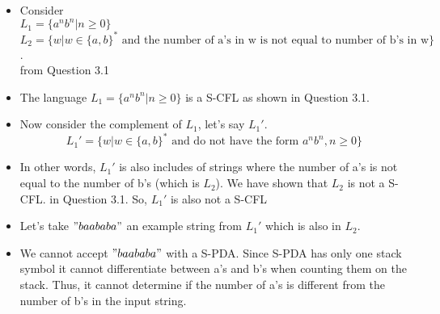 \documentclass[12pt]{article}
\begin{document}
\begin{itemize}
    \item Consider \\ $L_1 = \{a^nb^n | n \geq 0\}$ \\$L_2 = \{w | w \in \{a,b\}^* \mbox{ and the number of a's in w is not equal to number of b's in w}\}$. \\  
    from Question 3.1 
    \item The language $L_1 = \{a^nb^n | n \geq 0\}$ is a S-CFL as shown in Question 3.1.
    \item Now consider the complement of $L_1$, let's say $L_1'$. $$L_1' = \{w | w \in \{a,b\}^* \mbox{ and do not have the form $a^nb^n, n \geq 0$}\}$$
    \item In other words, $L_1'$ is also includes of strings where the number of a's is not equal to the number of b's (which is $L_2$). We have shown that $L_2$ is not a S-CFL. in Question 3.1. So, $L_1'$ is also not a S-CFL
    \item Let's take $"baababa"$ an example string from $L_1'$ which is also in $L_2$. 
    \item We cannot accept $"baababa"$ with a S-PDA. Since S-PDA has only one stack symbol it cannot differentiate between a’s and b’s when counting them on the stack. Thus, it cannot determine if the number of a’s is different from the number of b’s in the input string.
\end{itemize}



 
\end{document}
